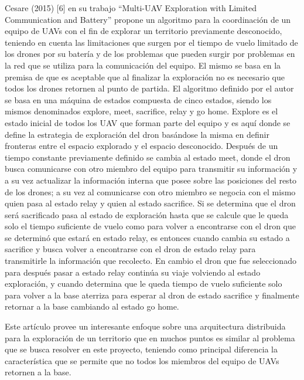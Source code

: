 Cesare (2015)  [6] en su trabajo “Multi-UAV Exploration with Limited Communication and Battery” propone un algoritmo para la coordinación de un equipo de UAVs con el fin de explorar un territorio previamente desconocido, teniendo en cuenta las limitaciones que surgen por el tiempo de vuelo limitado de los drones por su batería y de los problemas que pueden surgir por problemas en la red que se utiliza para la comunicación del equipo. El mismo se basa en la premisa de que es aceptable que al finalizar la exploración no es necesario que todos los drones retornen al punto de partida.
El algoritmo definido por el autor se basa en una máquina de estados compuesta de cinco estados, siendo los mismos denominados explore, meet, sacrifice, relay y go home. Explore es el estado inicial de todos los UAV que forman parte del equipo y es aquí donde se define la estrategia de exploración del dron basándose la misma en definir fronteras entre el espacio explorado y el espacio desconocido. Después de un tiempo constante previamente definido se cambia al estado meet, donde el dron busca comunicarse con otro miembro del equipo para transmitir su información y a su vez actualizar la información interna que posee sobre las posiciones del resto de los drones; a su vez al comunicarse con otro miembro se negocia con el mismo quien pasa al estado relay y quien al estado sacrifice. Si se determina que el dron será sacrificado pasa al estado de exploración hasta que se calcule que le queda solo el tiempo suficiente de vuelo como para volver a encontrarse con el dron que se determinó que estará en estado relay, es entonces cuando cambia su estado a sacrifice y busca volver a encontrarse con el dron de estado relay para transmitirle la información que recolecto. En cambio el dron que fue seleccionado para después pasar a estado relay continúa su viaje volviendo al estado exploración, y cuando determina que le queda tiempo de vuelo suficiente solo para volver a la base aterriza para esperar al dron de estado sacrifice y finalmente retornar a la base cambiando al estado go home.

Este artículo provee un interesante enfoque sobre una arquitectura distribuida para la exploración de un territorio que en muchos puntos es similar al problema que se busca resolver en este proyecto, teniendo como principal diferencia la característica que se permite que no todos los miembros del equipo de UAVs retornen a la base.

